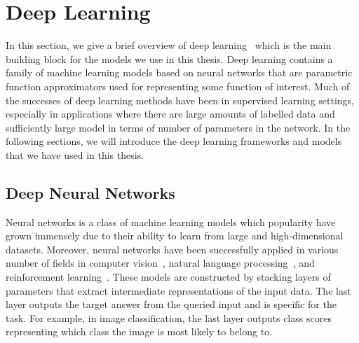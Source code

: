 



\section{Deep Learning}

In this section, we give a brief overview of deep learning~\cite{goodfellow2016deep} which is the main building block for the models we use in this thesis. Deep learning contains a family of machine learning models based on neural networks that are parametric function approximators used for representing some function of interest. Much of the successes of deep learning methods have been in supervised learning settings, especially in applications where there are large amounts of labelled data and sufficiently large model in terms of number of parameters in the network. In the following sections, we will introduce the deep learning frameworks and models that we have used in this thesis.   


\subsection{Deep Neural Networks}

Neural networks is a class of machine learning models which popularity have grown immensely due to their ability to learn from large and high-dimensional datasets. Moreover, neural networks have been successfully applied in various number of fields in computer vision~\cite{he2016deep, krizhevsky2012imagenet}, natural language processing~\cite{devlin2018bert}, and reinforcement learning~\cite{mnih2015human, silver2016mastering}. These models are constructed by stacking layers of parameters that extract intermediate representations of the input data. The last layer outputs the target answer from the queried input and is specific for the task. For example, in image classification, the last layer outputs class scores representing which class the image is most likely to belong to. 

